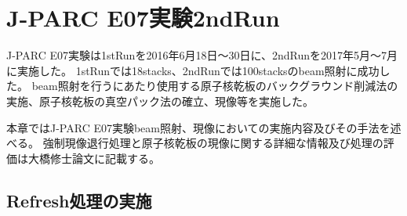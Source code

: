 \documentclass[12pt,a4paper]{jarticle}
\begin{document}
\newpage
\section{J-PARC E07実験2ndRun}
J-PARC E07実験は1stRunを2016年6月18日〜30日に、2ndRunを2017年5月～7月に実施した。
1stRunでは18stacks、2ndRunでは100stacksのbeam照射に成功した。
beam照射を行うにあたり使用する原子核乾板のバックグラウンド削減法の実施、原子核乾板の真空パック法の確立、現像等を実施した。
\par
本章ではJ-PARC E07実験beam照射、現像においての実施内容及びその手法を述べる。
強制現像退行処理と原子核乾板の現像に関する詳細な情報及び処理の評価は大橋修士論文に記載する。
\subsection{Refresh処理の実施}
\end{document}
